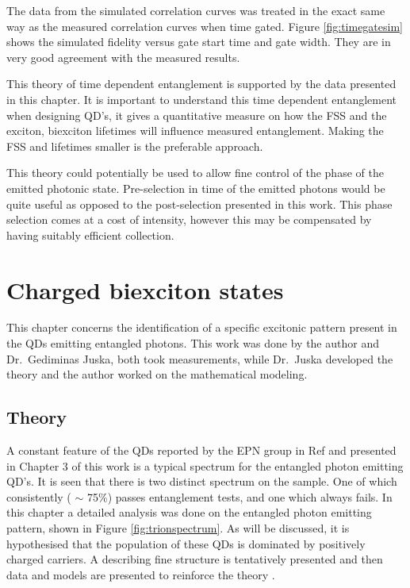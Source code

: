 \documentclass[12pt, twoside]{article}
\numberwithin{equation}{section}
\begin{document}
The data from the simulated correlation curves was treated in the exact
same way as the measured correlation curves when time gated. Figure
\ref{fig:timegatesim} shows the simulated fidelity versus gate start
time and gate width. They are in very good agreement with the measured
results.

This theory of time dependent entanglement is supported by the data
presented in this chapter. It is important to understand this time
dependent entanglement when designing QD's, it gives a quantitative
measure on how the FSS and the exciton, biexciton lifetimes will
influence measured entanglement. Making the FSS and lifetimes smaller is
the preferable approach.

This theory could potentially be used to allow fine control of the phase
of the emitted photonic state. Pre-selection in time of the emitted
photons would be quite useful as opposed to the post-selection presented
in this work. This phase selection comes at a cost of intensity, however
this may be compensated by having suitably efficient collection.
\newpage

\section{Charged biexciton states}

This chapter concerns the identification of a specific excitonic pattern
present in the QDs emitting entangled photons. This work was done by the
author and Dr.~Gediminas Juska, both took measurements, while Dr.~Juska
developed the theory and the author worked on the mathematical modeling.

\subsection{Theory}\label{theory}

A constant feature of the QDs reported by the EPN group in Ref
\cite{gjnature} and presented in Chapter 3 of this work is a typical
spectrum for the entangled photon emitting QD's. It is seen that there
is two distinct spectrum on the sample. One of which consistently (
$\sim$ 75\%) passes entanglement tests, and one which always fails. In
this chapter a detailed analysis was done on the entangled photon
emitting pattern, shown in Figure \ref{fig:trionspectrum}. As will be
discussed, it is hypothesised that the population of these QDs is
dominated by positively charged carriers. A describing fine structure is
tentatively presented and then data and models are presented to
reinforce the theory \cite{self}.
\end{document}
